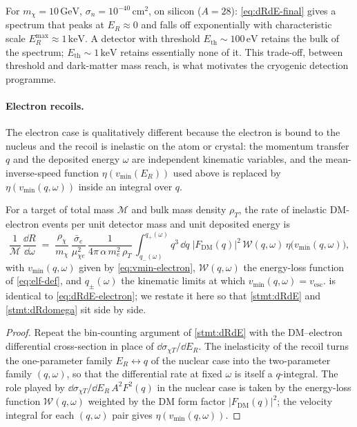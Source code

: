 \begin{example}
\label{ex:Si-spectrum}
For $m_\chi=10\,\text{GeV}$, $\sigma_n=10^{-40}\,\text{cm}^2$, on
silicon ($A=28$): \cref{eq:dRdE-final} gives a spectrum that peaks
at $E_R\approx 0$ and falls off exponentially with characteristic
scale $E_R^\text{max}\approx 1\,\text{keV}$. A detector with
threshold $E_\text{th}\sim 100\,\text{eV}$ retains the bulk of the
spectrum; $E_\text{th}\sim 1\,\text{keV}$ retains essentially none
of it. This trade-off, between threshold and dark-matter mass
reach, is what motivates the cryogenic detection programme.
\end{example}

\paragraph{Electron recoils.}
The electron case is qualitatively different because the
electron is bound to the nucleus and the recoil is inelastic on
the atom or crystal: the momentum transfer $q$ and the deposited
energy $\omega$ are independent kinematic variables, and the
mean-inverse-speed function $\eta(v_\text{min}(E_R))$ used above
is replaced by $\eta(v_\text{min}(q,\omega))$ inside an integral
over $q$.

\begin{statement}
\label{stmt:dRdomega}
For a target of total mass $\mathcal M$ and bulk mass density
$\rho_T$, the rate of inelastic DM-electron events per unit
detector mass and unit deposited energy is
\begin{equation}
\label{eq:dRdomega-restated}
\frac{1}{\mathcal M}\,\frac{\dd R}{\dd \omega}
\;=\; \frac{\rho_\chi}{m_\chi}\,
\frac{\bar\sigma_e}{\mu_{\chi e}^2}\,
\frac{1}{4\pi\,\alpha\,m_e^2\,\rho_T}\,
\int_{q_-(\omega)}^{q_+(\omega)}\!\! q^3\,\dd q\;
|F_\text{DM}(q)|^2\,\mathcal{W}(q,\omega)\,
\eta\!\bigl(v_\text{min}(q,\omega)\bigr),
\end{equation}
with $v_\text{min}(q,\omega)$ given by \cref{eq:vmin-electron},
$\mathcal{W}(q,\omega)$ the energy-loss function of
\cref{eq:elf-def}, and $q_\pm(\omega)$ the kinematic limits at
which $v_\text{min}(q,\omega)=v_\text{esc}$.
 is identical to \cref{eq:dRdE-electron};
we restate it here so that \cref{stmt:dRdE} and \cref{stmt:dRdomega}
sit side by side.
\end{statement}

\begin{proof}
Repeat the bin-counting argument of \cref{stmt:dRdE} with the
DM--electron differential cross-section in place of
$\dd\sigma_{\chi T}/\dd E_R$. The inelasticity of the recoil
turns the one-parameter family $E_R\leftrightarrow q$ of the
nuclear case into the two-parameter family $(q,\omega)$, so that
the differential rate at fixed $\omega$ is itself a $q$-integral.
The role played by $\dd\sigma_{\chi T}/\dd E_R\,A^2 F^2(q)$ in the
nuclear case is taken by the energy-loss function $\mathcal{W}(q,\omega)$
weighted by the DM form factor $|F_\text{DM}(q)|^2$; the velocity
integral for each $(q,\omega)$ pair gives $\eta(v_\text{min}(q,\omega))$.
\end{proof}

